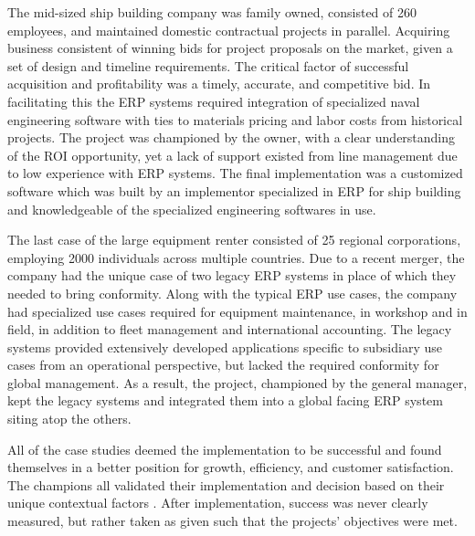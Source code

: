 \documentclass{article}
\begin{document}
The mid-sized ship building company was family owned, consisted of 260 employees, and maintained domestic contractual projects in parallel. 
Acquiring business consistent of winning bids for project proposals on the market, given a set of design and timeline requirements. 
The critical factor of successful acquisition and profitability was a timely, accurate, and competitive bid.
In facilitating this the ERP systems required integration of specialized naval engineering software with ties to materials pricing and labor costs from historical projects. 
The project was championed by the owner, with a clear understanding of the ROI opportunity, yet a lack of support existed from line management due to low experience with ERP systems. 
The final implementation was a customized software which was built by an implementor specialized in ERP for ship building and knowledgeable of the specialized engineering softwares in use. 

The last case of the large equipment renter consisted of 25 regional corporations, employing 2000 individuals across multiple countries. 
Due to a recent merger, the company had the unique case of two legacy ERP systems in place of which they needed to bring conformity. 
Along with the typical ERP use cases, the company had specialized use cases required for equipment maintenance, in workshop and in field, in addition to fleet management and international accounting. 
The legacy systems provided extensively developed applications specific to subsidiary use cases from an operational perspective, but lacked the required conformity for global management. 
As a result, the project, championed by the general manager, kept the legacy systems and integrated them into a global facing ERP system siting atop the others. 

All of the case studies deemed the implementation to be successful and found themselves in a better position for growth, efficiency, and customer satisfaction. 
The champions all validated their implementation and decision based on their unique contextual factors \cite{integrated_erp}. 
After implementation, success was never clearly measured, but rather taken as given such that the projects' objectives were met. 
\end{document}
